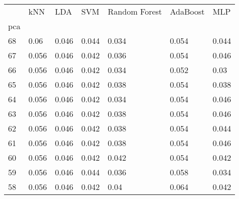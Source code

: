 \begin{tabular}{lllllll}
\toprule
{} &    kNN &    LDA &    SVM & Random Forest & AdaBoost &    MLP \\
pca &        &        &        &               &          &        \\
\midrule
68  &   0.06 &  0.046 &  0.044 &         0.034 &    0.054 &  0.044 \\
67  &  0.056 &  0.046 &  0.042 &         0.036 &    0.054 &  0.046 \\
66  &  0.056 &  0.046 &  0.042 &         0.034 &    0.052 &   0.03 \\
65  &  0.056 &  0.046 &  0.042 &         0.038 &    0.054 &  0.038 \\
64  &  0.056 &  0.046 &  0.042 &         0.034 &    0.054 &  0.046 \\
63  &  0.056 &  0.046 &  0.042 &         0.038 &    0.054 &  0.046 \\
62  &  0.056 &  0.046 &  0.042 &         0.038 &    0.054 &  0.044 \\
61  &  0.056 &  0.046 &  0.042 &         0.038 &    0.054 &  0.046 \\
60  &  0.056 &  0.046 &  0.042 &         0.042 &    0.054 &  0.042 \\
59  &  0.056 &  0.046 &  0.044 &         0.036 &    0.058 &  0.034 \\
58  &  0.056 &  0.046 &  0.042 &          0.04 &    0.064 &  0.042 \\
\bottomrule
\end{tabular}

